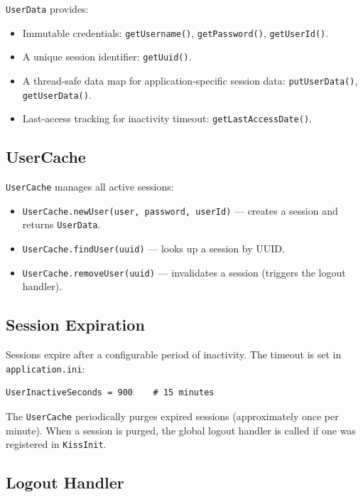 \noindent
\texttt{UserData} provides:
\begin{itemize}
  \item Immutable credentials: \texttt{getUsername()}, \texttt{getPassword()}, \texttt{getUserId()}.
  \item A unique session identifier: \texttt{getUuid()}.
  \item A thread-safe data map for application-specific session data: \texttt{putUserData()}, \texttt{getUserData()}.
  \item Last-access tracking for inactivity timeout: \texttt{getLastAccessDate()}.
\end{itemize}

\subsection{UserCache}

\texttt{UserCache} manages all active sessions:

\begin{itemize}
  \item \texttt{UserCache.newUser(user, password, userId)} --- creates a session and returns \texttt{UserData}.
  \item \texttt{UserCache.findUser(uuid)} --- looks up a session by UUID.
  \item \texttt{UserCache.removeUser(uuid)} --- invalidates a session (triggers the logout handler).
\end{itemize}

\subsection{Session Expiration}

Sessions expire after a configurable period of inactivity.  The timeout is set in \texttt{application.ini}:

\begin{lstlisting}[style=ini]
UserInactiveSeconds = 900    # 15 minutes
\end{lstlisting}

\noindent
The \texttt{UserCache} periodically purges expired sessions (approximately once per minute).  When a session is purged, the global logout handler is called if one was registered in \texttt{KissInit}.

\subsection{Logout Handler}


